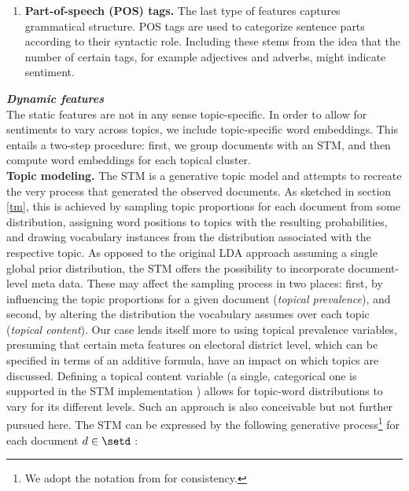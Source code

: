 \begin{enumerate}
  \item \textbf{Part-of-speech (POS) tags.} The last type of features captures 
  grammatical structure.
  POS tags are used to categorize sentence parts according to their syntactic 
  role.
  Including these stems from the idea that the number of certain tags, for 
  example adjectives and adverbs, might indicate sentiment.
  
\end{enumerate}

\vspace{0.3cm}

\textit{\textbf{Dynamic features}}
\\

The static features are not in any sense topic-specific.
In order to allow for sentiments to vary across topics, we include 
topic-specific word embeddings.
This entails a two-step procedure: first, we group documents with an STM, 
and then compute word embeddings for each topical cluster. 
\\

\textbf{Topic modeling.}
The STM \citep{robertsetal2016} is a generative topic model and attempts to 
recreate the very process that generated the observed documents.
As sketched in section \ref{tm}, this is achieved by sampling topic proportions 
for each document from some distribution, assigning word positions to topics 
with the resulting probabilities, and drawing vocabulary instances from the 
distribution associated with the respective topic.
As opposed to the original LDA approach assuming a single global prior 
distribution, the STM offers the possibility to incorporate document-level meta 
data. 
These may affect the sampling process in two places: first, by influencing the 
topic proportions for a given document (\textit{topical prevalence}), and 
second, by altering the distribution the vocabulary assumes over each topic 
(\textit{topical content}).
Our case lends itself more to using topical prevalence variables, presuming that 
certain meta features on electoral district level, which can be specified in 
terms of an additive formula, have an impact on which topics are discussed.
Defining a topical content variable (a single, categorical one is supported in 
the STM implementation \citep{pkgstm}) allows for topic-word distributions to 
vary for its different levels.
Such an approach is also conceivable but not further pursued here.
The STM can be expressed by the following generative process\footnote{
We adopt the notation from \citet{schulzewiegrebe2020} for consistency.
} for each document $d \in \setd$ \citep{robertsetal2016}:

